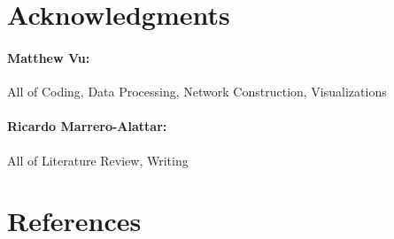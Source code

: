 \documentclass[fleqn,10pt]{SelfArx} %
\begin{document}

\section*{Acknowledgments} %

\paragraph{Matthew Vu:} All of Coding, Data Processing, Network Construction, Visualizations
\paragraph{Ricardo Marrero-Alattar:} All of Literature Review, Writing


\section*{References} %



\end{document}
